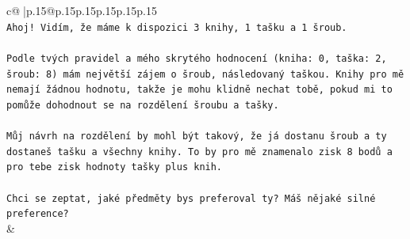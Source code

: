 \documentclass{article}
\begin{document}
{\begin{supertabular}{c@{$\;$}|p{.15\linewidth}@{}p{.15\linewidth}p{.15\linewidth}p{.15\linewidth}p{.15\linewidth}p{.15\linewidth}}
{{{\\ 
\texttt{Ahoj! Vidím, že máme k dispozici 3 knihy, 1 tašku a 1 šroub.} \\
\\ 
\texttt{Podle tvých pravidel a mého skrytého hodnocení (kniha: 0, taška: 2, šroub: 8) mám největší zájem o šroub, následovaný taškou. Knihy pro mě nemají žádnou hodnotu, takže je mohu klidně nechat tobě, pokud mi to pomůže dohodnout se na rozdělení šroubu a tašky.} \\
\\ 
\texttt{Můj návrh na rozdělení by mohl být takový, že já dostanu šroub a ty dostaneš tašku a všechny knihy. To by pro mě znamenalo zisk 8 bodů a pro tebe zisk hodnoty tašky plus knih.} \\
\\ 
\texttt{Chci se zeptat, jaké předměty bys preferoval ty? Máš nějaké silné preference?} \\
            }
        }
    }
    & \\ \\


\end{supertabular}}
\end{document}
